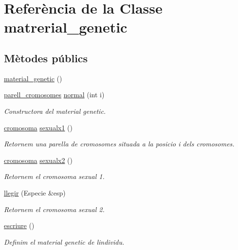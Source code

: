 \hypertarget{classmatrerial__genetic}{}\section{Referència de la Classe matrerial\+\_\+genetic}
\label{classmatrerial__genetic}
\subsection*{Mètodes públics}
\begin{DoxyCompactItemize}
\item 
\hyperlink{classmatrerial__genetic_ad477d416cc4fa1babb97c70f936d92a5}{material\+\_\+genetic} ()
\item 
\hyperlink{classparell__cromosomes}{parell\+\_\+cromosomes} \hyperlink{classmatrerial__genetic_a7dd3b921332743dbe09f8212695cfc04}{normal} (int i)
\begin{DoxyCompactList}\small\item\em Constructora del material genetic. \end{DoxyCompactList}\item 
\hyperlink{classcromosoma}{cromosoma} \hyperlink{classmatrerial__genetic_a837ea787960ae9a5124b883df81e6fec}{sexualx1} ()
\begin{DoxyCompactList}\small\item\em Retornem una parella de cromosomes situada a la posicio i dels cromosomes. \end{DoxyCompactList}\item 
\hyperlink{classcromosoma}{cromosoma} \hyperlink{classmatrerial__genetic_a1ac242f8322bf0430102a263c3300cf8}{sexualx2} ()
\begin{DoxyCompactList}\small\item\em Retornem el cromosoma sexual 1. \end{DoxyCompactList}\item 
\hyperlink{classmatrerial__genetic_aa0935cfcdc01fcaf44e90b16661423a0}{llegir} (Especie \&esp)
\begin{DoxyCompactList}\small\item\em Retornem el cromosoma sexual 2. \end{DoxyCompactList}\item 
\hyperlink{classmatrerial__genetic_a4b2d00c6f920bee84eb8211b7622b2ef}{escriure} ()
\begin{DoxyCompactList}\small\item\em Definim el material genetic de l\textquotesingle{}individu. \end{DoxyCompactList}\end{DoxyCompactItemize}


